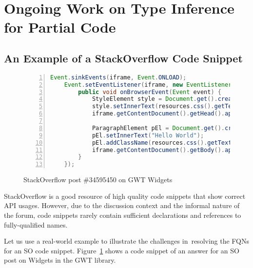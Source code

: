 \section{Ongoing Work on Type Inference for Partial Code}
\label{sec:statype}

\subsection{An Example of a StackOverflow Code Snippet}

\begin{figure}[t]
\begin{lstlisting}[basicstyle=\footnotesize\sffamily, stepnumber=1, numbers=left, numbersep=-6pt, framexleftmargin=0mm, framexrightmargin=0mm, language=Java, emph ={Event,sinkEvents,iframe,setEventListener,EventListener,StyleElement,Document,get,createStyleElement,setInnerText,resources,css,getText,getContentDocument,getHead,getBody,appendChild,ParagraphElement,createPElement,addClassName,whatever}]
    Event.sinkEvents(iframe, Event.ONLOAD);
    Event.setEventListener(iframe, new EventListener() {
        public void onBrowserEvent(Event event) {
            StyleElement style = Document.get().createStyleElement();
            style.setInnerText(resources.css().getText());
            iframe.getContentDocument().getHead().appendChild(style);

            ParagraphElement pEl = Document.get().createPElement();
            pEl.setInnerText("Hello World");
            pEl.addClassName(resources.css().getText());
            iframe.getContentDocument().getBody().appendChild(pEl);
        }
    });
\end{lstlisting}
\vspace{-0.1in}
\caption{StackOverflow post \#34595450 on GWT Widgets~\cite{soexample}}
\label{example}
\end{figure}

StackOverflow is a good resource of high quality code snippets that
show correct API usages. However, due to the discussion context and
the informal nature of the forum, code snippets rarely contain
sufficient declarations and references to fully-qualified names.


Let us use a real-world example to illustrate the 
challenges in~resolving 
the FQNs for an SO code snippet. Figure~\ref{example} shows a
code snippet of an answer for an SO post
on Widgets in the GWT library. 

